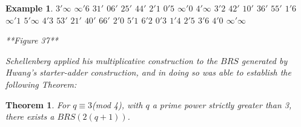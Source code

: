 \documentclass[
  11pt,
  a4paper]{book}
\newtheorem{theorem}{Theorem}
\newtheorem{example}{Example}
\begin{document}
\begin{example}
                                                $3' \infty$                                  $\infty ' 6$      $31'$                           $06'$           $25'$           $44'$                           $2'1$             $0'5$
   $\infty ' 0$                                                $4' \infty$                                     $3'2$           $42'$                           $10'$           $36'$           $55'$                             $1'6$
                  $\infty ' 1$                                                $5' \infty$                                      $4'3$           $53'$                           $21'$           $40'$           $66'$             $2'0$
                                                                                                               $5'1$           $6'2$           $0'3$           $1'4$           $2'5$           $3'6$           $4'0$       $\infty ' \infty$

**Figure 37**

Schellenberg applied his multiplicative construction to the
$BRS$ generated by Hwang’s starter-adder construction, and
in doing so was able to establish the following Theorem:
\end{example}

\begin{theorem}
For $q \equiv 3$(mod 4), with $q$ a prime power strictly
greater than 3, there exists a $BRS(2(q+1))$.
\end{theorem}
\end{document}

